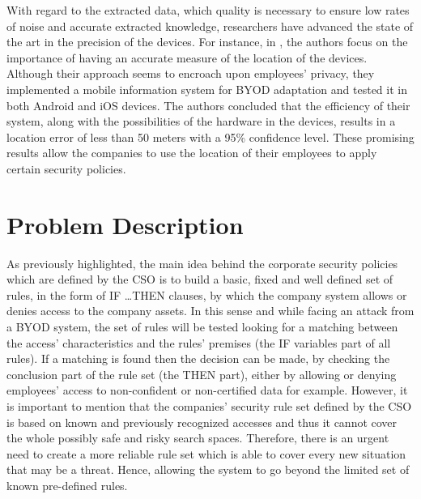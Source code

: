 \documentclass[a4paper,10pt,twocolumn,preprint,3p]{elsarticle}
\begin{document}
With regard to the extracted data, which quality is necessary to ensure low rates of noise and accurate extracted knowledge, researchers have advanced the state of the art in the precision of the devices. For instance, in \cite{rios2015mobile}, the authors focus on the importance of having an accurate measure of the location of the devices. Although their approach seems to encroach upon employees' privacy, they implemented a mobile information system for BYOD adaptation and tested it in both Android and iOS devices. The authors concluded that the efficiency of their system, along with the possibilities of the hardware in the devices, results in a location error of less than 50 meters with a 95\% confidence level. These promising results allow the companies to use the location of their employees to apply certain security policies.  %

\section{Problem Description}
\label{sec:problem}

As previously highlighted, the main idea behind the corporate security policies which are defined by the CSO is to build a basic, fixed and well defined set of rules, in the form of \textsc{IF \ldots THEN} clauses,  by which the company system allows or denies access to the company assets. In this sense and while facing an attack from a BYOD system, the set of rules will be tested looking for a matching between the access' characteristics and the rules' premises (the IF variables part of all rules). If a matching is found then the decision can be made, by checking the conclusion part of the rule set (the THEN part), either by allowing or denying employees' access to non-confident or non-certified data for example. However, it is important to mention that the companies' security rule set defined by the CSO is based on known and previously recognized accesses and thus it cannot cover the whole possibly safe and risky search spaces. Therefore, there is an urgent need to create a more reliable rule set which is able to cover every new situation that may be a threat. Hence, allowing the system to go beyond the limited set of known pre-defined rules.
\end{document}
